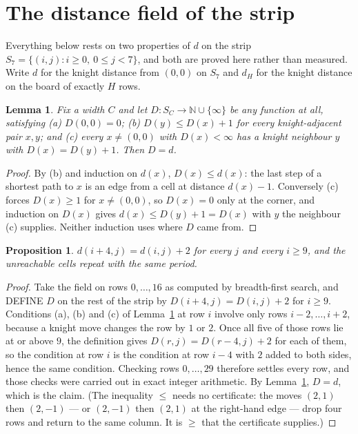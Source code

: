 \documentclass[11pt,a4paper]{article}
\theoremstyle{plain}
\newtheorem{lemma}[theorem]{Lemma}
\newtheorem{proposition}[theorem]{Proposition}
\theoremstyle{definition}
\begin{document}
\section{The distance field of the strip}

Everything below rests on two properties of $d$ on the strip $S_{7}=\{(i,j): i\ge 0,\ 0\le j<7\}$, and both are proved here rather than measured. Write $d$ for the knight distance from $(0,0)$ on $S_{7}$ and $d_H$ for the knight distance on the board of exactly $H$ rows.

\begin{lemma}\label{lem:bellman}
Fix a width $C$ and let $D:S_C\to\mathbb{N}\cup\{\infty\}$ be any function at all, satisfying
(a) $D(0,0)=0$; (b) $D(y)\le D(x)+1$ for every knight-adjacent pair $x,y$; and
(c) every $x\ne(0,0)$ with $D(x)<\infty$ has a knight neighbour $y$ with $D(x)=D(y)+1$. Then $D=d$.
\end{lemma}

\begin{proof}
By (b) and induction on $d(x)$, $D(x)\le d(x)$: the last step of a shortest path to $x$ is an edge from a cell at distance $d(x)-1$. Conversely (c) forces $D(x)\ge1$ for $x\ne(0,0)$, so $D(x)=0$ only at the corner, and induction on $D(x)$ gives $d(x)\le D(y)+1=D(x)$ with $y$ the neighbour (c) supplies. Neither induction uses where $D$ came from.
\end{proof}

\begin{proposition}\label{prop:period}
$d(i+4,j)=d(i,j)+2$ for every $j$ and every $i\ge9$, and the unreachable cells repeat with the same period.
\end{proposition}

\begin{proof}
Take the field on rows $0,\dots,16$ as computed by breadth-first search, and DEFINE $D$ on the rest of the strip by $D(i+4,j)=D(i,j)+2$ for $i\ge9$. Conditions (a), (b) and (c) of Lemma~\ref{lem:bellman} at row $i$ involve only rows $i-2,\dots,i+2$, because a knight move changes the row by $1$ or $2$. Once all five of those rows lie at or above $9$, the definition gives $D(r,j)=D(r-4,j)+2$ for each of them, so the condition at row $i$ is the condition at row $i-4$ with $2$ added to both sides, hence the same condition. Checking rows $0,\dots,29$ therefore settles every row, and those checks were carried out in exact integer arithmetic. By Lemma~\ref{lem:bellman}, $D=d$, which is the claim. (The inequality $\le$ needs no certificate: the moves $(2,1)$ then $(2,-1)$ --- or $(2,-1)$ then $(2,1)$ at the right-hand edge --- drop four rows and return to the same column. It is $\ge$ that the certificate supplies.)
\end{proof}
\end{document}
